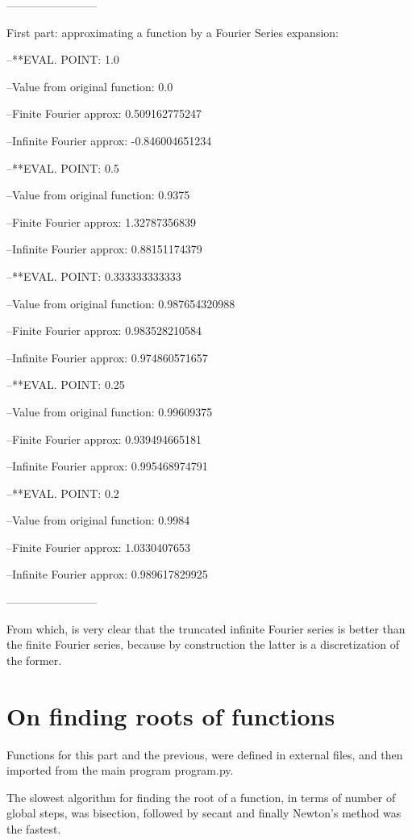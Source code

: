 \documentclass[paper=a4, fontsize=11pt]{scrartcl} %
\numberwithin{equation}{section} %
\numberwithin{figure}{section} %
\numberwithin{table}{section} %
\begin{document}
------------------------

First part: approximating a function by a Fourier Series expansion: 

 --**EVAL. POINT: 1.0
 
 --Value from original function: 0.0
 
 --Finite Fourier approx: 0.509162775247
 
 --Infinite Fourier approx: -0.846004651234
 
 --**EVAL. POINT: 0.5
 
 --Value from original function: 0.9375
 
 --Finite Fourier approx: 1.32787356839
 
 --Infinite Fourier approx: 0.88151174379
 
 --**EVAL. POINT: 0.333333333333
 
 --Value from original function: 0.987654320988
 
 --Finite Fourier approx: 0.983528210584
 
 --Infinite Fourier approx: 0.974860571657
 
 --**EVAL. POINT: 0.25
 
 --Value from original function: 0.99609375
 
 --Finite Fourier approx: 0.939494665181
 
 --Infinite Fourier approx: 0.995468974791
 
 --**EVAL. POINT: 0.2
 
 --Value from original function: 0.9984
 
 --Finite Fourier approx: 1.0330407653
 
 --Infinite Fourier approx: 0.989617829925
 
------------------------

From which, is very clear that the truncated infinite Fourier series is better than the finite Fourier series, because by construction the latter is a discretization of the former.


\section{On finding roots of functions}


Functions for this part and the previous, were defined in external files, and then imported from the main program program.py.

The slowest algorithm for finding the root of a function, in terms of number of global steps, was bisection, followed by secant and finally Newton's method was the fastest.
\end{document}

